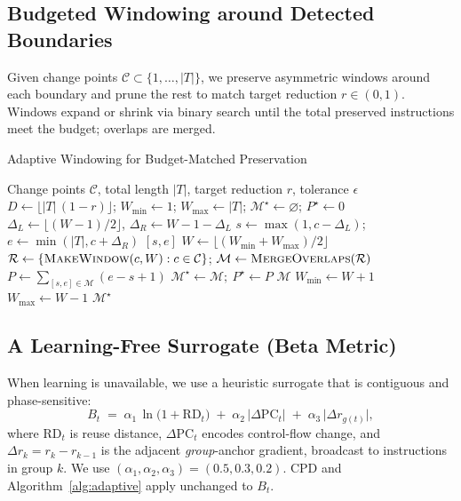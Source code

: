 \subsection{Budgeted Windowing around Detected Boundaries}
Given change points \(\mathcal{C}\subset\{1,\ldots,|T|\}\), we preserve asymmetric windows around each boundary and prune the rest to match target reduction \(r\in(0,1)\). Windows expand or shrink via binary search until the total preserved instructions meet the budget; overlaps are merged.
\begin{algorithm}[t]
\caption{Adaptive Windowing for Budget-Matched Preservation}
\label{alg:adaptive}
\small
\begin{algorithmic}[1]
\Require Change points \(\mathcal{C}\), total length \(|T|\), target reduction \(r\), tolerance \(\epsilon\)
\State \(D\gets \lfloor |T|\,(1-r)\rfloor\); \(W_{\min}\gets 1\); \(W_{\max}\gets |T|\); \(\mathcal{M}^\star\gets\varnothing\); \(P^\star\gets 0\)
  \State \(\Delta_L\gets\lfloor(W-1)/2\rfloor\), \(\Delta_R\gets W-1-\Delta_L\)
  \State \(s\gets\max(1,c-\Delta_L)\); \(e\gets\min(|T|,c+\Delta_R)\)
  \State \Return \([s,e]\)
\EndFunction
{}
  \State \(W\gets\lfloor(W_{\min}+W_{\max})/2\rfloor\)
  \State \(\mathcal{R}\gets \{\textsc{MakeWindow}(c,W):c\in\mathcal{C}\}\); \(\mathcal{M}\gets \textsc{MergeOverlaps}(\mathcal{R})\)
  \State \(P\gets\sum_{[s,e]\in\mathcal{M}}(e-s+1)\)
   \(\mathcal{M}^\star\gets\mathcal{M};\ P^\star\gets P\) \EndIf
   \Return \(\mathcal{M}\) \EndIf
   \State \(W_{\min}\gets W+1\) \Else \State \(W_{\max}\gets W-1\) \EndIf
\EndWhile
\State \Return \(\mathcal{M}^\star\) 
\end{algorithmic}
\end{algorithm}
\subsection{A Learning-Free Surrogate (Beta Metric)}
\label{subsec:beta}
When learning is unavailable, we use a heuristic surrogate that is contiguous and phase-sensitive:
\begin{equation}
\label{eq:beta}
B_t \;=\; \alpha_1\,\ln\big(1+\mathrm{RD}_t\big)\;+\;\alpha_2\,\big|\Delta\mathrm{PC}_t\big|\;+\;\alpha_3\,\big|\Delta r_{g(t)}\big|,
\end{equation}
where \(\mathrm{RD}_t\) is reuse distance, \(\Delta\mathrm{PC}_t\) encodes control-flow change, and \(\Delta r_k=r_k-r_{k-1}\) is the adjacent \emph{group}-anchor gradient, broadcast to instructions in group \(k\). We use \((\alpha_1,\alpha_2,\alpha_3)=(0.5,0.3,0.2)\). CPD and Algorithm~\ref{alg:adaptive} apply unchanged to \(B_t\).
